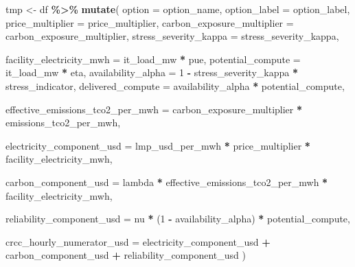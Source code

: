 \documentclass[
]{article}
\newenvironment{Shaded}{\begin{snugshade}}{\end{snugshade}}
\newcommand{\AttributeTok}[1]{\textcolor[rgb]{0.13,0.29,0.53}{#1}}
\newcommand{\DecValTok}[1]{\textcolor[rgb]{0.00,0.00,0.81}{#1}}
\newcommand{\FunctionTok}[1]{\textcolor[rgb]{0.13,0.29,0.53}{\textbf{#1}}}
\newcommand{\NormalTok}[1]{#1}
\newcommand{\OtherTok}[1]{\textcolor[rgb]{0.56,0.35,0.01}{#1}}
\newcommand{\SpecialCharTok}[1]{\textcolor[rgb]{0.81,0.36,0.00}{\textbf{#1}}}
\begin{document}
\begin{Shaded}
\begin{Highlighting}[]
\NormalTok{  tmp }\OtherTok{\textless{}{-}}\NormalTok{ df }\SpecialCharTok{\%\textgreater{}\%}
    \FunctionTok{mutate}\NormalTok{(}
      \AttributeTok{option =}\NormalTok{ option\_name,}
      \AttributeTok{option\_label =}\NormalTok{ option\_label,}
      \AttributeTok{price\_multiplier =}\NormalTok{ price\_multiplier,}
      \AttributeTok{carbon\_exposure\_multiplier =}\NormalTok{ carbon\_exposure\_multiplier,}
      \AttributeTok{stress\_severity\_kappa =}\NormalTok{ stress\_severity\_kappa,}

      \AttributeTok{facility\_electricity\_mwh =}\NormalTok{ it\_load\_mw }\SpecialCharTok{*}\NormalTok{ pue,}
      \AttributeTok{potential\_compute =}\NormalTok{ it\_load\_mw }\SpecialCharTok{*}\NormalTok{ eta,}
      \AttributeTok{availability\_alpha =} \DecValTok{1} \SpecialCharTok{{-}}\NormalTok{ stress\_severity\_kappa }\SpecialCharTok{*}\NormalTok{ stress\_indicator,}
      \AttributeTok{delivered\_compute =}\NormalTok{ availability\_alpha }\SpecialCharTok{*}\NormalTok{ potential\_compute,}

      \AttributeTok{effective\_emissions\_tco2\_per\_mwh =}\NormalTok{ carbon\_exposure\_multiplier }\SpecialCharTok{*}\NormalTok{ emissions\_tco2\_per\_mwh,}

      \AttributeTok{electricity\_component\_usd =}
\NormalTok{        lmp\_usd\_per\_mwh }\SpecialCharTok{*}\NormalTok{ price\_multiplier }\SpecialCharTok{*}\NormalTok{ facility\_electricity\_mwh,}

      \AttributeTok{carbon\_component\_usd =}
\NormalTok{        lambda }\SpecialCharTok{*}\NormalTok{ effective\_emissions\_tco2\_per\_mwh }\SpecialCharTok{*}\NormalTok{ facility\_electricity\_mwh,}

      \AttributeTok{reliability\_component\_usd =}
\NormalTok{        nu }\SpecialCharTok{*}\NormalTok{ (}\DecValTok{1} \SpecialCharTok{{-}}\NormalTok{ availability\_alpha) }\SpecialCharTok{*}\NormalTok{ potential\_compute,}

      \AttributeTok{crcc\_hourly\_numerator\_usd =}
\NormalTok{        electricity\_component\_usd }\SpecialCharTok{+}
\NormalTok{        carbon\_component\_usd }\SpecialCharTok{+}
\NormalTok{        reliability\_component\_usd}
\NormalTok{    )}


\end{Highlighting}
\end{Shaded}
\end{document}
